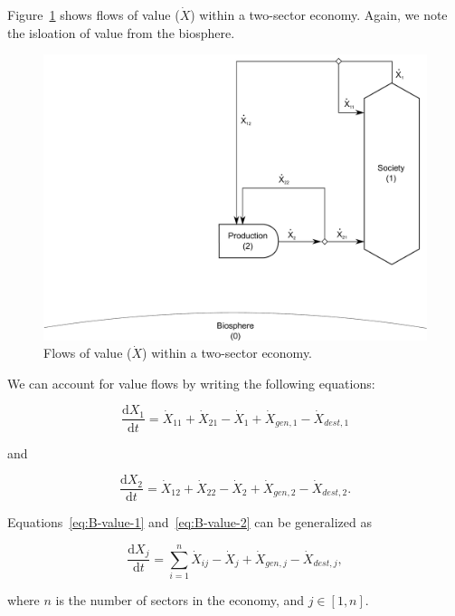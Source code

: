 Figure~\ref{fig:B_value} shows flows of value ($\dot{X}$) 
within a two-sector economy. 
Again, we note the isloation of value from the biosphere.

\begin{figure}[!ht]
\centering
\includegraphics[width=0.8\linewidth]{Part_2/Chapter_Values/images/2_sector_value.pdf}
\caption[Flows of value within a two-sector economy.]{Flows of value ($\dot{X}$) within a two-sector economy.}
\label{fig:B_value}
\end{figure}

We can account for value flows by writing
the following equations:

\begin{equation}\label{eq:B-value-1}
	\frac{\mathrm{d}X_{1}}{\mathrm{d}t}
	= \dot{X}_{11}
	+ \dot{X}_{21}
	- \dot{X}_{1}
	+ \dot{X}_{gen,1}
	- \dot{X}_{dest,1}
\end{equation}

\noindent{}and

\begin{equation}\label{eq:B-value-2}
	\frac{\mathrm{d}X_{2}}{\mathrm{d}t}
	= \dot{X}_{12}
	+ \dot{X}_{22}
	- \dot{X}_{2}
	+ \dot{X}_{gen,2}
	- \dot{X}_{dest,2}.
\end{equation}

Equations~\ref{eq:B-value-1} and~\ref{eq:B-value-2}
can be generalized as

\begin{equation}\label{eq:B-value-generalized}
	\frac{\mathrm{d}X_{j}}{\mathrm{d}t}
	= \sum\limits_{i=1}^n \dot{X}_{ij}
	- \dot{X}_{j}
	+ \dot{X}_{gen,j}
	- \dot{X}_{dest,j},
\end{equation}

\noindent{}where $n$ is the number of sectors in the economy, and $j \in [1, n]$.


